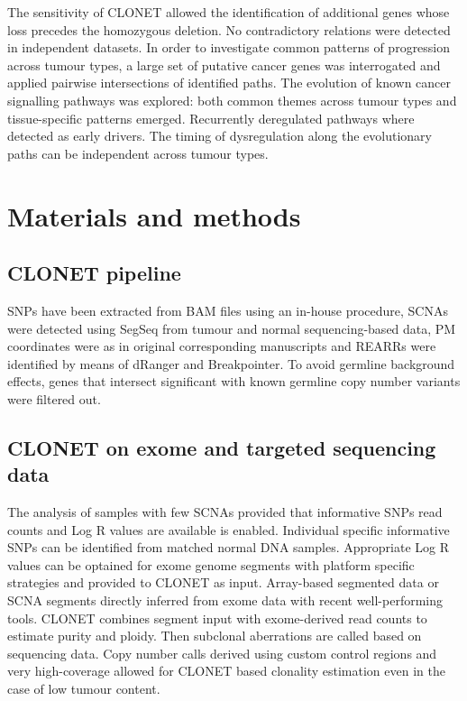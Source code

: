 	The sensitivity of CLONET allowed the identification of additional genes whose loss precedes the homozygous deletion.
	No contradictory relations were detected in independent datasets.
	In order to investigate common patterns of progression across tumour types, a large set of putative cancer genes was interrogated and applied pairwise intersections of identified paths.
	The evolution of known cancer signalling pathways was explored: both common themes across tumour types and tissue-specific patterns emerged.
	Recurrently deregulated pathways where detected as early drivers.
	The timing of dysregulation along the evolutionary paths can be independent across tumour types.

\section{Materials and methods}

	\subsection{CLONET pipeline}
	SNPs have been extracted from BAM files using an in-house procedure, SCNAs were detected using SegSeq from tumour and normal sequencing-based data, PM coordinates were as in original corresponding manuscripts and REARRs were identified by means of dRanger and Breakpointer.
	To avoid germline background effects, genes that intersect significant with known germline copy number variants were filtered out.

	\subsection{CLONET on exome and targeted sequencing data}
	The analysis of samples with few SCNAs provided that informative SNPs read counts and Log R values are available is enabled.
	Individual specific informative SNPs can be identified from matched normal DNA samples.
	Appropriate Log R values can be optained for exome genome segments with platform specific strategies and provided to CLONET as input.
	Array-based segmented data or SCNA segments directly inferred from exome data with recent well-performing tools.
	CLONET combines segment input with exome-derived read counts to estimate purity and ploidy.
	Then subclonal aberrations are called based on sequencing data.
	Copy number calls derived using custom control regions and very high-coverage allowed for CLONET based clonality estimation even in the case of low tumour content.

